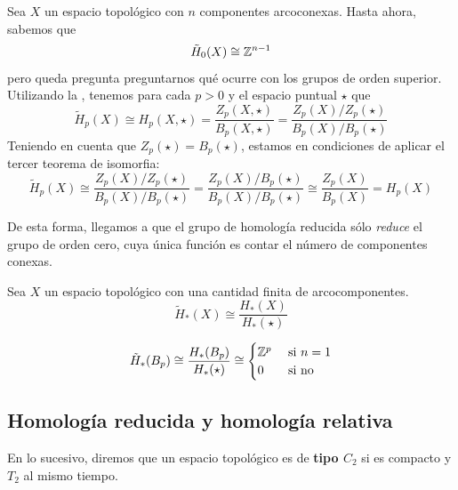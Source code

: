 Sea $X$ un espacio topológico con $n$ componentes arcoconexas. Hasta ahora,
sabemos que
\[\tilde H_0(X) \cong \mathbb{Z}^{n-1}\]
pero queda pregunta preguntarnos qué ocurre con los grupos de orden
superior. Utilizando la , tenemos para cada $p > 0$ y
el espacio puntual $\star$ que
\[\tilde{H}_p(X)\cong H_p(X,\star)=\frac{Z_p(X,\star)}{B_p(X,\star)}=
\frac{Z_p(X)/Z_p(\star)}{B_p(X)/B_p(\star)}\]
Teniendo en cuenta que $Z_p(\star)=B_p(\star)$, estamos en condiciones de
aplicar el tercer teorema de isomorfia:
\[\tilde{H}_p(X)\cong \frac{Z_p(X)/Z_p(\star)}{B_p(X)/B_p(\star)}=
\frac{Z_p(X)/B_p(\star)}{B_p(X)/B_p(\star)} \cong
\frac{Z_p(X)}{B_p(X)}=H_p(X)\]

De esta forma, llegamos a que el grupo de homología reducida sólo
\textit{reduce} el grupo de orden cero, cuya única función es contar el
número de componentes conexas.

\begin{corollary}\label{HomoReducida}
Sea $X$ un espacio topológico con una cantidad finita de arcocomponentes.
\[\tilde{H}_*(X)\cong \frac{H_*(X)}{H_*(\star)}\]
\end{corollary}

\begin{example}
$$\tilde{H}_*(B_p)\cong\frac{H_*(B_p)}{H_*(\star)}\cong
\begin{cases}\mathbb{Z}^p & \mbox{ si } n=1\\0 & \mbox{ si no}\end{cases}$$
\end{example}

\subsection{Homología reducida y homología relativa}
En lo sucesivo, diremos que un espacio topológico es de \textbf{tipo $C_2$}
si es compacto y $T_2$ al mismo tiempo.


